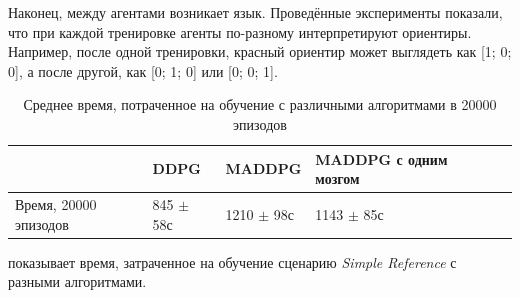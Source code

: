Наконец, между агентами возникает язык. Проведённые эксперименты показали, что при каждой тренировке агенты по-разному интерпретируют ориентиры. Например, после одной тренировки, красный ориентир может выглядеть как [1; 0; 0], а после другой, как [0; 1; 0] или [0; 0; 1].

\begin{table}[t!]
	\centering\small
	\caption{Среднее время, потраченное на обучение с различными алгоритмами в 20000 эпизодов}
	\label{tab-sr-time}
	\begin{tabular}{|l|l|l|l|l|l|}
		\hline
		&DDPG&MADDPG&MADDPG с одним мозгом\\
		\hline
		Время, 20000 эпизодов & 845 $\pm$ 58с & 1210 $\pm$ 98с & 1143 $\pm$ 85с\\ \hline
	\end{tabular}
	\normalsize%
\end{table}

 показывает время, затраченное на обучение сценарию \textit{Simple Reference} с разными алгоритмами.